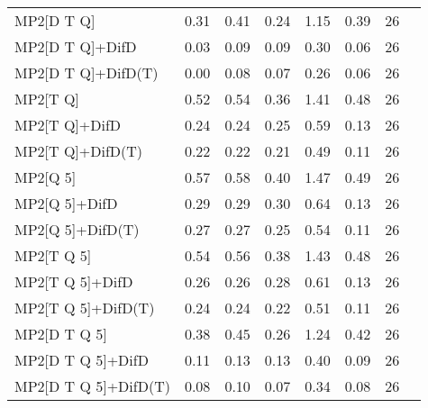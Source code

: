 \begin{table}
\begin{tabular}{l l l l l l l l }
    MP2[D T Q] & 0.31 & 0.41 & 0.24 & 1.15 & 0.39 & 26 \\ 
    MP2[D T Q]+DifD & 0.03 & 0.09 & 0.09 & 0.30 & 0.06 & 26 \\ 
    MP2[D T Q]+DifD(T) & 0.00 & 0.08 & 0.07 & 0.26 & 0.06 & 26 \\ 
    MP2[T Q] & 0.52 & 0.54 & 0.36 & 1.41 & 0.48 & 26 \\ 
    MP2[T Q]+DifD & 0.24 & 0.24 & 0.25 & 0.59 & 0.13 & 26 \\ 
    MP2[T Q]+DifD(T) & 0.22 & 0.22 & 0.21 & 0.49 & 0.11 & 26 \\ 
    MP2[Q 5] & 0.57 & 0.58 & 0.40 & 1.47 & 0.49 & 26 \\ 
    MP2[Q 5]+DifD & 0.29 & 0.29 & 0.30 & 0.64 & 0.13 & 26 \\ 
    MP2[Q 5]+DifD(T) & 0.27 & 0.27 & 0.25 & 0.54 & 0.11 & 26 \\ 
    MP2[T Q 5] & 0.54 & 0.56 & 0.38 & 1.43 & 0.48 & 26 \\ 
    MP2[T Q 5]+DifD & 0.26 & 0.26 & 0.28 & 0.61 & 0.13 & 26 \\ 
    MP2[T Q 5]+DifD(T) & 0.24 & 0.24 & 0.22 & 0.51 & 0.11 & 26 \\ 
    MP2[D T Q 5] & 0.38 & 0.45 & 0.26 & 1.24 & 0.42 & 26 \\ 
    MP2[D T Q 5]+DifD & 0.11 & 0.13 & 0.13 & 0.40 & 0.09 & 26 \\ 
    MP2[D T Q 5]+DifD(T) & 0.08 & 0.10 & 0.07 & 0.34 & 0.08 & 26 \\ 
    \bottomrule
  \end{tabular}
\end{table}
